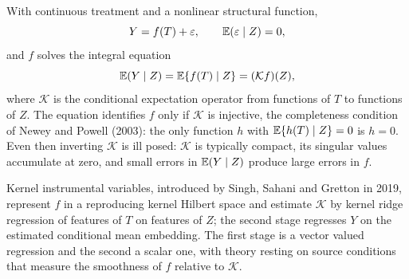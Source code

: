 With continuous treatment and a nonlinear structural function,
\[
Y = f(T) + \varepsilon, \qquad \mathbb{E}(\varepsilon \mid Z) = 0,
\]
and $f$ solves the integral equation
\[
\mathbb{E}(Y \mid Z) = \mathbb{E}\{f(T) \mid Z\} = (\mathcal{K} f)(Z),
\]
where $\mathcal{K}$ is the conditional expectation operator from functions of $T$ to functions of $Z$. The equation identifies $f$ only if $\mathcal{K}$ is injective, the completeness condition of Newey and Powell (2003): the only function $h$ with $\mathbb{E}\{h(T) \mid Z\} = 0$ is $h = 0$. Even then inverting $\mathcal{K}$ is ill posed: $\mathcal{K}$ is typically compact, its singular values accumulate at zero, and small errors in $\mathbb{E}(Y \mid Z)$ produce large errors in $f$.

Kernel instrumental variables, introduced by Singh, Sahani and Gretton in 2019, represent $f$ in a reproducing kernel Hilbert space and estimate $\mathcal{K}$ by kernel ridge regression of features of $T$ on features of $Z$; the second stage regresses $Y$ on the estimated conditional mean embedding. The first stage is a vector valued regression and the second a scalar one, with theory resting on source conditions that measure the smoothness of $f$ relative to $\mathcal{K}$.

